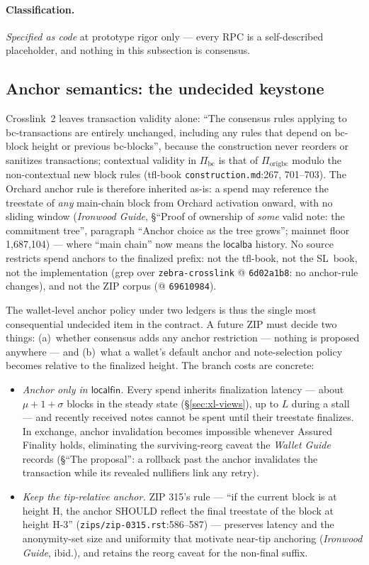 \documentclass[11pt,a4paper]{article}
\theoremstyle{definition}
\begin{document}
\paragraph{Classification.} \emph{Specified as code} at prototype rigor
only --- every RPC is a self-described placeholder, and nothing in this
subsection is consensus.

\subsection{Anchor semantics: the undecided keystone}
\label{sec:xl-anchors}

Crosslink~2 leaves transaction validity alone: ``The consensus rules
applying to bc-transactions are entirely unchanged, including any rules
that depend on bc-block height or previous bc-blocks'', because the
construction never reorders or sanitizes transactions; contextual validity
in $\Pi_{\mathrm{bc}}$ is that of $\Pi_{\mathrm{origbc}}$ modulo the
non-contextual new block rules (tfl-book \texttt{construction.md}:267,
701--703). The Orchard anchor rule is therefore inherited as-is: a spend
may reference the treestate of \emph{any} main-chain block from Orchard
activation onward, with no sliding window (\emph{Ironwood Guide},
\S``Proof of ownership of \emph{some} valid note: the commitment tree'',
paragraph ``Anchor choice as the tree grows''; mainnet floor 1{,}687{,}104)
--- where ``main chain'' now means the $\mathsf{localba}$ history. No
source restricts spend anchors to the finalized prefix: not the tfl-book,
not the SL~book, not the implementation (grep over
\texttt{zebra-crosslink} @ \texttt{6d02a1b8}: no anchor-rule changes), and
not the ZIP corpus (@ \texttt{69610984}).

The wallet-level anchor policy under two ledgers is thus the single most
consequential undecided item in the contract. A future ZIP must decide
two things: (a)~whether consensus adds any anchor restriction --- nothing
is proposed anywhere --- and (b)~what a wallet's default anchor and
note-selection policy becomes relative to the finalized height. The
branch costs are concrete:
\begin{itemize}
\item \emph{Anchor only in $\mathsf{localfin}$.} Every spend inherits
  finalization latency --- about $\mu + 1 + \sigma$ blocks in the steady
  state (\S\ref{sec:xl-views}), up to $L$ during a stall --- and recently
  received notes cannot be spent until their treestate finalizes. In
  exchange, anchor invalidation becomes impossible whenever Assured
  Finality holds, eliminating the surviving-reorg caveat the \emph{Wallet
  Guide} records (\S``The proposal'': a rollback past the anchor
  invalidates the transaction while its revealed nullifiers link any
  retry).
\item \emph{Keep the tip-relative anchor.} ZIP 315's rule --- ``if the
  current block is at height H, the anchor SHOULD reflect the final
  treestate of the block at height H-3'' (\texttt{zips/zip-0315.rst}:586--587)
  --- preserves latency and the anonymity-set size and uniformity that
  motivate near-tip anchoring (\emph{Ironwood Guide}, ibid.), and retains
  the reorg caveat for the non-final suffix.
\end{itemize}
\end{document}
